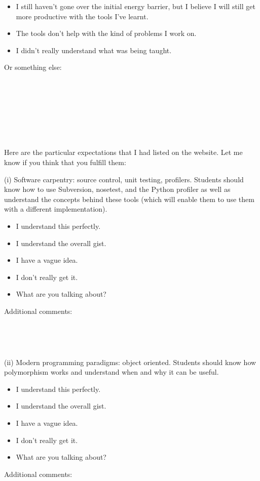 \documentclass[article,twoside]{memoir}
\newcommand*{\fillunderscore}{~\hrulefill}
\newcommand*{\checkbox}{$\square$}
\begin{document}
\begin{itemize}[\checkbox]
\item I still haven't gone over the initial energy barrier, but I believe I will still get more productive with the tools I've learnt.
\item The tools don't help with the kind of problems I work on.
\item I didn't really understand what was being taught.
\end{itemize}

Or something else:\par
\fillunderscore\par
\fillunderscore\par
\fillunderscore\par
\fillunderscore\par

Here are the particular expectations that I had listed on the website. Let me know if you think that you fulfill them:

    (i) Software carpentry: source control, unit testing, profilers. Students should know how to use Subversion, nosetest, and the Python profiler as well as understand the concepts behind these tools (which will enable them to use them with a different implementation).

\begin{itemize}[\checkbox]
\item I understand this perfectly.
\item I understand the overall gist.
\item I have a vague idea.
\item I don't really get it.
\item What are you talking about?
\end{itemize}
Additional comments:
\fillunderscore\par
\fillunderscore\par
\fillunderscore\par


    (ii) Modern programming paradigms: object oriented. Students should know how polymorphism works and understand when and why it can be useful.
\begin{itemize}[\checkbox]
\item I understand this perfectly.
\item I understand the overall gist.
\item I have a vague idea.
\item I don't really get it.
\item What are you talking about?
\end{itemize}
Additional comments:
\fillunderscore\par
\fillunderscore\par
\fillunderscore\par
\end{document}

